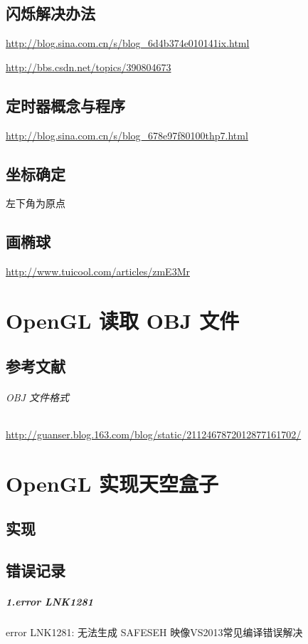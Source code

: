 \documentclass[UTF8,a4paper,12pt]{ctexbook}
\begin{document}
	\section{闪烁解决办法}
		\url{http://blog.sina.com.cn/s/blog_6d4b374e010141ix.html}
		    
		\url{http://bbs.csdn.net/topics/390804673}
			
	\section{定时器概念与程序}
		\url{http://blog.sina.com.cn/s/blog_678e97f80100thp7.html}
			
			
	\section{坐标确定}
		左下角为原点
		
	\section{画椭球}
		\url{http://www.tuicool.com/articles/zmE3Mr}
		

\chapter{OpenGL 读取 OBJ 文件}
    \section{参考文献} 
		\subparagraph{OBJ 文件格式}\url{http://guanser.blog.163.com/blog/static/2112467872012877161702/}
	
	
 
\chapter{OpenGL 实现天空盒子}
	\section{实现}
		
	\section{错误记录}
		\paragraph{1.error LNK1281}error LNK1281: 无法生成 SAFESEH 映像VS2013常见编译错误解决
		
\end{document}
